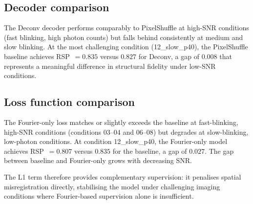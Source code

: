 \subsection{Decoder comparison}

The Deconv decoder performs comparably to PixelShuffle at high-SNR conditions (fast
blinking, high photon counts) but falls behind consistently at medium and slow blinking.
At the most challenging condition (12\_slow\_p40), the PixelShuffle baseline achieves
RSP~$=0.835$ versus $0.827$ for Deconv, a gap of $0.008$ that represents a meaningful
difference in structural fidelity under low-SNR conditions.


\subsection{Loss function comparison}

The Fourier-only loss matches or slightly exceeds the baseline at fast-blinking, high-SNR
conditions (conditions 03--04 and 06--08) but degrades at slow-blinking,
low-photon conditions. At condition 12\_slow\_p40, the Fourier-only model achieves
RSP~$=0.807$ versus $0.835$ for the baseline, a gap of $0.027$.
 The gap between baseline and Fourier-only grows with decreasing SNR.

The L1 term therefore provides complementary supervision: it penalises spatial
misregistration directly, stabilising the model under challenging imaging conditions
where Fourier-based supervision alone is insufficient.

